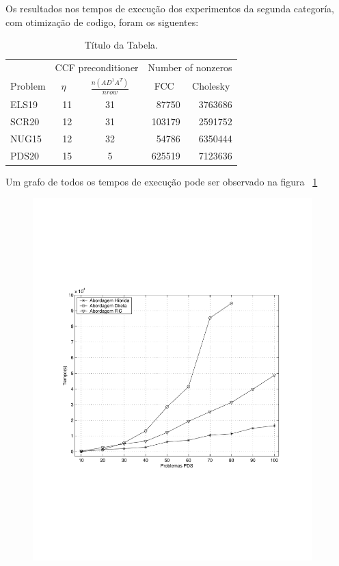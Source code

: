 \documentclass[12pt,fleqn]{article}
\begin{document}
Os resultados nos tempos de execução dos experimentos da segunda categoría, com otimização de codigo, foram os siguentes: 
\begin{table}[htb] 
\begin{center} 
\begin{tabular}{|l|r|c|r|r|} \hline 
 
& \multicolumn{2}{|c|}{{CCF preconditioner}} & \multicolumn{2}{|c|}{{Number of nonzeros}} \\ \cline{2­5} 
{Problem}   & \multicolumn{1}{|c|}{$\eta$}  & \multicolumn{1}{|c|}{$ \frac{n(AD^{­1}A^T)}{nrow}$} & \multicolumn{1}{|c|}{FCC} & \multicolumn{1}{|c|}{Cholesky}  \\ \hline \hline 
ELS­19 &  ­11 & 31 &  87750  & 3763686  \\\hline 
SCR20 &  ­12 & 31 &  103179 & 2591752  \\\hline 
NUG15 &  ­12 & 32 &  54786  & 6350444 \\\hline 
PDS­20 &   15 & 5  &  625519 & 7123636\\\hline \end{tabular} 
\caption{Título da Tabela.}   
\label{tabn2} 
\end{center} 
\end{table} 
 
Um grafo de todos os tempos de execução pode ser observado na figura ~\ref{fig:pdsmodel} 
 
\begin{figure}[htb] 
\centering 
 
\includegraphics[height=14cm]{Images/figura} 
\label{fig:pdsmodel} 
\end{figure} 
 
\end{document}
